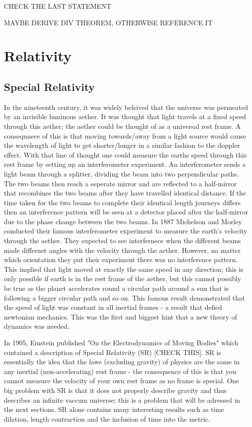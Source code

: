 CHECK THE LAST STATEMENT

MAYBE DERIVE DIV THEOREM, OTHERWISE REFERENCE IT



\section{Relativity}

\subsection{Special Relativity}

In the nineteenth century, it was widely beleived that the universe was permeated by an invisible luminous aether. It was thought that light travels at a fixed speed through this aether; the aether could be thought of as a universal rest frame. A consequnece of this is that moving towards/away from a light source would cause the wavelength of light to get shorter/longer in a similar fashion to the doppler effect. With that line of thought one could measure the earths speed through this rest frame by setting up an interferometer experiment. An interferometer sends a light beam through a splitter, dividing the beam into two perpendicular paths. The two beams then reach a seperate mirror and are reflected to a half-mirror that recombines the two beams after they have travelled identical distance. If the time taken for the two beams to complete their identical length journeys differs then an interference pattern will be seen at a detector placed after the half-mirror due to the phase change between the two beams. In 1887 Michelson and Morley conducted their famous interferometer experiment to measure the earth's velocity through the aether. They expected to see interfernece when the different beams made differnet angles with the velocity through the aether. However, no matter which orientation they put their experiment there was no interference pattern. This implied that light moved at exactly the same speed in any direction; this is only possible if earth is in the rest frame of the aether, but this cannot possibly be true as the planet accelerates round a circular path around a sun that is following a bigger circular path and so on. This famous result demonstrated that the speed of light was constant in all inertial frames - a result that defied newtonian mechanics. This was the first and biggest hint that a new theory of dynamics was needed. 

In 1905, Einstein published "On the Electrodynamics of Moving Bodies" which contained a description of Special Relativity (SR) [CHECK THIS]. SR is essentially the idea that the laws (excluding gravity) of physics are the same in any inertial (non-accelerating) rest frame - the consequence of this is that you cannot measure the velocity of your own rest frame as no frame is special. One big problem with SR is that it does not properly describe gravity and thus describes an infinite vaccum universe; this is a problem that will be adressed in the next sections. SR alone contains many interesting results such as time dilation, length contraction and the inclusion of time into the metric. 

